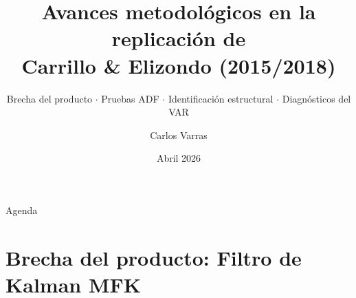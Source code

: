\documentclass[aspectratio=169, 10pt]{beamer}
\title[Avances metodológicos]{Avances metodológicos en la replicación de\\
  Carrillo \& Elizondo (2015/2018)}
\subtitle{Brecha del producto $\cdot$ Pruebas ADF $\cdot$
          Identificación estructural $\cdot$ Diagnósticos del VAR}
\author{Carlos Varras}
\institute[ITAM]{Instituto Tecnológico Autónomo de México\\
  \smallskip Seminario de Investigación}
\date{Abril 2026}
\begin{document}

{
\begin{frame}
  \titlepage
\end{frame}
}

\begin{frame}{Agenda}
  \tableofcontents[hideallsubsections]
\end{frame}

\section{Brecha del producto: Filtro de Kalman MFK}
\end{document}
